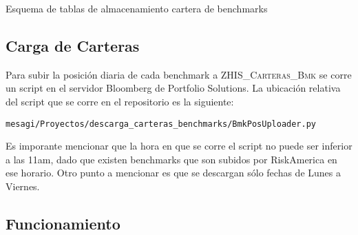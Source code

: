 \documentclass{article}
\begin{document}
\begin{table}[h]
{\scriptsize
{}}
\caption{Esquema de tablas de almacenamiento cartera de benchmarks}
\label{bmk-sch}
\end{table}



\subsection{Carga de Carteras}
Para subir la posición diaria de cada benchmark a \textsc{ZHIS\_Carteras\_Bmk} se corre un script en el servidor Bloomberg de Portfolio Solutions. La ubicación relativa del script que se corre en el repositorio es la siguiente:
\begin{center}
\texttt{mesagi/Proyectos/descarga\_carteras\_benchmarks/BmkPosUploader.py}
\end{center}

Es imporante mencionar que la hora en que se corre el script no puede ser inferior a las 11am, dado que existen benchmarks que son subidos por RiskAmerica en ese horario. Otro punto a mencionar es que se descargan sólo fechas de Lunes a Viernes.
\subsection{Funcionamiento}
\end{document}
